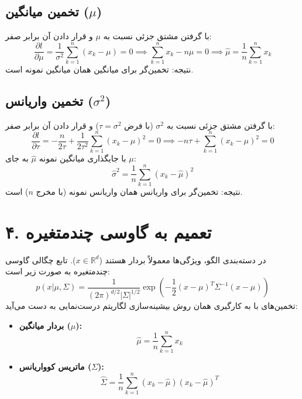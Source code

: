 \documentclass{article}
\begin{document}
\subsection*{تخمین میانگین ($\mu$)}
با گرفتن مشتق جزئی نسبت به $\mu$ و قرار دادن آن برابر صفر:
\[
\frac{\partial l}{\partial \mu} = \frac{1}{\sigma^2} \sum_{k=1}^n (x_k - \mu) = 0 \implies \sum_{k=1}^n x_k - n\hat{\mu} = 0 \implies \hat{\mu} = \frac{1}{n} \sum_{k=1}^n x_k
\]
نتیجه: تخمین‌گر  برای میانگین همان میانگین نمونه است.

\subsection*{تخمین واریانس ($\sigma^2$)}
با گرفتن مشتق جزئی نسبت به $\sigma^2$ (با فرض $\tau = \sigma^2$) و قرار دادن آن برابر صفر:
\[
\frac{\partial l}{\partial \tau} = -\frac{n}{2\tau} + \frac{1}{2\tau^2} \sum_{k=1}^n (x_k - \mu)^2 = 0 \implies -n\tau + \sum_{k=1}^n (x_k - \mu)^2 = 0
\]
با جایگذاری میانگین نمونه $\hat{\mu}$ به جای $\mu$:
\[
\hat{\sigma}^2 = \frac{1}{n} \sum_{k=1}^n (x_k - \hat{\mu})^2
\]
نتیجه: تخمین‌گر  برای واریانس همان واریانس نمونه (با مخرج $n$) است.

\section*{۴. تعمیم به گاوسی چندمتغیره}
در دسته‌بندی الگو، ویژگی‌ها معمولاً بردار هستند ($x \in \mathbb{R}^d$). تابع چگالی گاوسی چندمتغیره به صورت زیر است:
\[
p(x|\mu, \Sigma) = \frac{1}{(2\pi)^{d/2} |\Sigma|^{1/2}} \exp\left( -\frac{1}{2} (x-\mu)^T \Sigma^{-1} (x-\mu) \right)
\]
تخمین‌های  با به کارگیری همان روش بیشینه‌سازی لگاریتم درست‌نمایی به دست می‌آید:
\begin{itemize}
    \item \textbf{بردار میانگین ($\mu$):} 
    \[
    \hat{\mu} = \frac{1}{n} \sum_{k=1}^n x_k
    \]
    \item \textbf{ماتریس کوواریانس ($\Sigma$):} 
    \[
    \hat{\Sigma} = \frac{1}{n} \sum_{k=1}^n (x_k - \hat{\mu}) (x_k - \hat{\mu})^T
    \]
\end{itemize}
\end{document}
